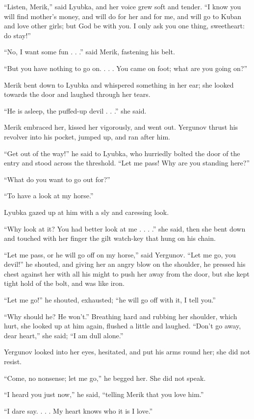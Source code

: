 “Listen, Merik,” said Lyubka, and her voice grew soft and tender. “I
know you will find mother’s money, and will do for her and for me, and
will go to Kuban and love other girls; but God be with you. I only ask
you one thing, sweetheart: do stay!”

“No, I want some fun . . .” said Merik, fastening his belt.

“But you have nothing to go on. . . . You came on foot; what are you
going on?”

Merik bent down to Lyubka and whispered something in her ear; she looked
towards the door and laughed through her tears.

“He is asleep, the puffed-up devil . . .” she said.

Merik embraced her, kissed her vigorously, and went out. Yergunov thrust
his revolver into his pocket, jumped up, and ran after him.

“Get out of the way!” he said to Lyubka, who hurriedly bolted the door
of the entry and stood across the threshold. “Let me pass! Why are you
standing here?”

“What do you want to go out for?”

“To have a look at my horse.”

Lyubka gazed up at him with a sly and caressing look.

“Why look at it? You had better look at me . . . .” she said, then she
bent down and touched with her finger the gilt watch-key that hung on
his chain.

“Let me pass, or he will go off on my horse,” said Yergunov. “Let me go,
you devil!” he shouted, and giving her an angry blow on the shoulder, he
pressed his chest against her with all his might to push her away from
the door, but she kept tight hold of the bolt, and was like iron.

“Let me go!” he shouted, exhausted; “he will go off with it, I tell
you.”

“Why should he? He won’t.” Breathing hard and rubbing her shoulder,
which hurt, she looked up at him again, flushed a little and laughed.
“Don’t go away, dear heart,” she said; “I am dull alone.”

Yergunov looked into her eyes, hesitated, and put his arms round her;
she did not resist.

“Come, no nonsense; let me go,” he begged her. She did not speak.

“I heard you just now,” he said, “telling Merik that you love him.”

“I dare say. . . . My heart knows who it is I love.”

